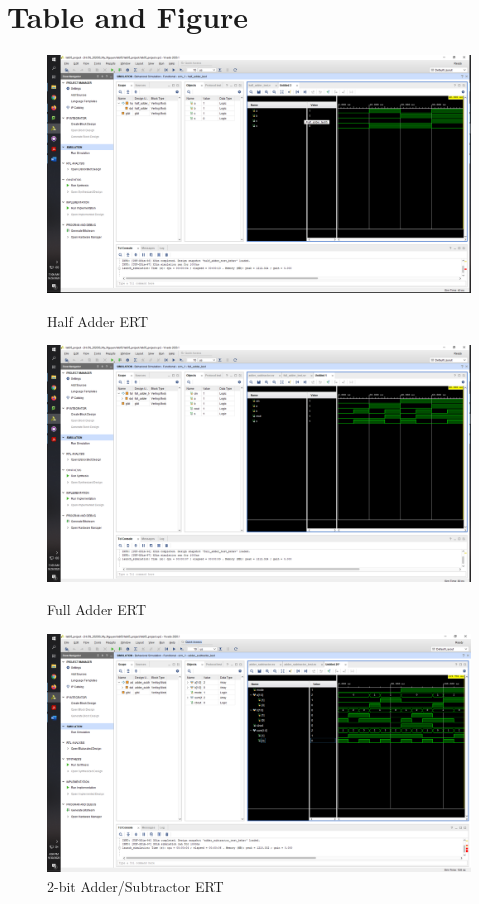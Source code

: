 \documentclass[11pt]{article}
\begin{document}
\section*{Table and Figure}
\begin{figure}[ht]
	\centering
	
	\includegraphics[width=\textwidth,trim=40cm 30cm 2cm 8cm,clip]{"half_adder"}
	\caption{Half Adder ERT}
	\includegraphics[width=\textwidth,trim=40cm 30cm 2cm 8cm,clip]{"full_adder"}
	\caption{Full Adder ERT}
	\includegraphics[width=\textwidth,trim=40cm 25cm 2cm 8cm,clip]{"adder_subtractor"}
	\caption{2-bit Adder/Subtractor ERT}
\end{figure}
\end{document}
